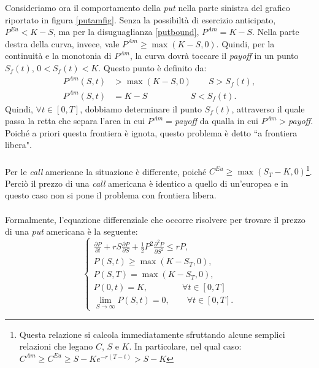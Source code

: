 \documentclass[a4paper,10pt]{report}
\newcommand{\der}[2]{\frac{\partial #1}{\partial #2}}
\newcommand{\dder}[2]{\frac{\partial^2 #1}{\partial #2^2}}
\theoremstyle{plain}
\theoremstyle{definition}
\theoremstyle{remark}
\begin{document}
Consideriamo ora il comportamento della \emph{put} nella parte sinistra del grafico riportato in figura \ref{putamfig}. Senza la possibilt\`a di esercizio anticipato, $P^{Eu}<K-S$, ma per la disuguaglianza \ref{putbound}, $P^{Am}=K-S$. Nella parte destra della curva, invece, vale $P^{Am}\geq \max(K-S,0)$. Quindi, per la continuit\`a e la monotonia di $P^{Am}$, la curva dovr\`a toccare il \emph{payoff} in un punto $S_f(t)$, $0<S_f(t)<K$. Questo punto \`e definito da:
\begin{align*}
P^{Am}(S,t)&>\max(K-S,0)\qquad S>S_f(t),\\
P^{Am}(S,t)&=K-S\qquad\qquad\quad S<S_f(t).
\end{align*}
Quindi, $\forall t\in[0,T]$, dobbiamo determinare il punto $S_f(t)$, attraverso il quale passa la retta che separa l'area in cui $P^{Am}=$\emph{payoff} da qualla in cui $P^{Am}>$\emph{payoff}. Poich\'e a priori questa frontiera \`e ignota, questo problema \`e detto ``a frontiera libera".\\\\Per le \emph{call} americane la situazione \`e differente, poich\'e $C^{Eu}\geq \max(S_T-K,0)$\footnote{Questa relazione si calcola immediatamente sfruttando alcune semplici relazioni che legano $C$, $S$ e $K$. In particolare, nel qual caso: $C^{Am}\geq C^{Eu} \geq S-Ke^{-r(T-t)} > S-K$}. Perci\`o il prezzo di una \emph{call} americana \`e identico a quello di un'europea e in questo caso non si pone il problema con frontiera libera.\\\\Formalmente, l'equazione differenziale che occorre risolvere per trovare il prezzo di una \emph{put} americana \`e la seguente:
\begin{equation}
\begin{cases}
\displaystyle
\der{P}{t}+r S \der{P}{S} +\frac{1}{2}P^2\dder{P}{S}\leq rP,\\
P(S,t)\geq \max(K-S_T,0),\\
P(S,T)=\max(K-S_T,0),\\
P(0,t)=K,\qquad\qquad\forall t\in[0,T]\\
\lim\limits_{S\to\infty}P(S,t)=0,\qquad\forall t\in[0,T].
\end{cases}
\label{putam1d}
\end{equation}
\end{document}

